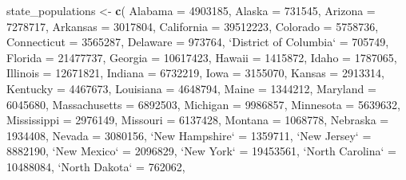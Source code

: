 \documentclass[
]{book}
\newenvironment{Shaded}{\begin{snugshade}}{\end{snugshade}}
\newcommand{\DataTypeTok}[1]{\textcolor[rgb]{0.13,0.29,0.53}{#1}}
\newcommand{\DecValTok}[1]{\textcolor[rgb]{0.00,0.00,0.81}{#1}}
\newcommand{\KeywordTok}[1]{\textcolor[rgb]{0.13,0.29,0.53}{\textbf{#1}}}
\newcommand{\NormalTok}[1]{#1}
\newcommand{\StringTok}[1]{\textcolor[rgb]{0.31,0.60,0.02}{#1}}
\begin{document}
\begin{itemize}
\begin{Shaded}
\begin{Highlighting}[]
\NormalTok{state_populations <-}\StringTok{ }\KeywordTok{c}\NormalTok{(}
    \DataTypeTok{Alabama =} \DecValTok{4903185}\NormalTok{, }\DataTypeTok{Alaska =} \DecValTok{731545}\NormalTok{, }\DataTypeTok{Arizona =} \DecValTok{7278717}\NormalTok{, }\DataTypeTok{Arkansas =} \DecValTok{3017804}\NormalTok{,}
    \DataTypeTok{California =} \DecValTok{39512223}\NormalTok{, }\DataTypeTok{Colorado =} \DecValTok{5758736}\NormalTok{, }\DataTypeTok{Connecticut =} \DecValTok{3565287}\NormalTok{,}
    \DataTypeTok{Delaware =} \DecValTok{973764}\NormalTok{, }\StringTok{`}\DataTypeTok{District of Columbia}\StringTok{`}\NormalTok{ =}\StringTok{ }\DecValTok{705749}\NormalTok{, }\DataTypeTok{Florida =} \DecValTok{21477737}\NormalTok{,}
    \DataTypeTok{Georgia =} \DecValTok{10617423}\NormalTok{, }\DataTypeTok{Hawaii =} \DecValTok{1415872}\NormalTok{, }\DataTypeTok{Idaho =} \DecValTok{1787065}\NormalTok{, }\DataTypeTok{Illinois =} \DecValTok{12671821}\NormalTok{,}
    \DataTypeTok{Indiana =} \DecValTok{6732219}\NormalTok{, }\DataTypeTok{Iowa =} \DecValTok{3155070}\NormalTok{, }\DataTypeTok{Kansas =} \DecValTok{2913314}\NormalTok{, }\DataTypeTok{Kentucky =} \DecValTok{4467673}\NormalTok{,}
    \DataTypeTok{Louisiana =} \DecValTok{4648794}\NormalTok{, }\DataTypeTok{Maine =} \DecValTok{1344212}\NormalTok{, }\DataTypeTok{Maryland =} \DecValTok{6045680}\NormalTok{, }\DataTypeTok{Massachusetts =} \DecValTok{6892503}\NormalTok{,}
    \DataTypeTok{Michigan =} \DecValTok{9986857}\NormalTok{, }\DataTypeTok{Minnesota =} \DecValTok{5639632}\NormalTok{, }\DataTypeTok{Mississippi =} \DecValTok{2976149}\NormalTok{,}
    \DataTypeTok{Missouri =} \DecValTok{6137428}\NormalTok{, }\DataTypeTok{Montana =} \DecValTok{1068778}\NormalTok{, }\DataTypeTok{Nebraska =} \DecValTok{1934408}\NormalTok{, }\DataTypeTok{Nevada =} \DecValTok{3080156}\NormalTok{,}
    \StringTok{`}\DataTypeTok{New Hampshire}\StringTok{`}\NormalTok{ =}\StringTok{ }\DecValTok{1359711}\NormalTok{, }\StringTok{`}\DataTypeTok{New Jersey}\StringTok{`}\NormalTok{ =}\StringTok{ }\DecValTok{8882190}\NormalTok{, }\StringTok{`}\DataTypeTok{New Mexico}\StringTok{`}\NormalTok{ =}\StringTok{ }\DecValTok{2096829}\NormalTok{,}
    \StringTok{`}\DataTypeTok{New York}\StringTok{`}\NormalTok{ =}\StringTok{ }\DecValTok{19453561}\NormalTok{, }\StringTok{`}\DataTypeTok{North Carolina}\StringTok{`}\NormalTok{ =}\StringTok{ }\DecValTok{10488084}\NormalTok{, }\StringTok{`}\DataTypeTok{North Dakota}\StringTok{`}\NormalTok{ =}\StringTok{ }\DecValTok{762062}\NormalTok{,}

\end{Highlighting}
\end{Shaded}
\end{itemize}
\end{document}
